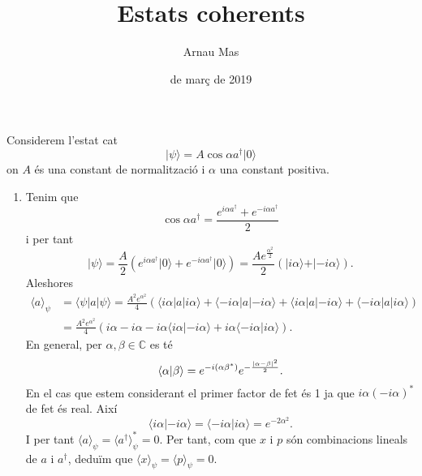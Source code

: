 \documentclass[12pt]{article}
\title{\sffamily {\bfseries Entrega 1:} Estats coherents}
\author{\sffamily Arnau Mas}
\date{\sffamily 18 de març de 2019}
\numberwithin{table}{section}
\numberwithin{figure}{section}
\numberwithin{equation}{section}
\newcommand{\C}{\mathbb{C}}
\let\Im\relax
\DeclareMathOperator{\Im}{Im}
\newcommand{\abs}[1]{\lvert #1 \rvert}
\newcommand{\ket}[1]{\vert {#1} \rangle}
\newcommand{\bra}[1]{\langle #1 \vert}
\newcommand{\braket}[2]{\langle {#1} \vert {#2} \rangle}
\begin{document}
\maketitle

Considerem l'estat cat
\begin{equation*}
	\ket{\psi} = A \cos{\alpha a^{\dagger}} \ket{0}
\end{equation*}
on \( A \) és una constant de normalització i \( \alpha \) una constant positiva.

\begin{enumerate}[label=(\alph*), font=\bfseries \sffamily, wide, labelwidth=!, labelindent=0pt]
	\item Tenim que
		\begin{equation*}
		\cos{\alpha a^\dagger} = \frac{e^{i\alpha a^\dagger} + e^{-i \alpha a^\dagger}}{2}
		\end{equation*}
	i per tant
	\begin{equation*}
		\ket{\psi} = \frac{A}{2} \left(e^{i\alpha a^\dagger} \ket{0} + e^{-i \alpha a^\dagger} \ket{0} \right) = \frac{Ae^{\frac{\alpha^2}{2}}}{2}\left(\ket{i\alpha} + \ket{-i\alpha}\right).
	\end{equation*}
Aleshores
\begin{align*}
	\langle a \rangle_\psi & = \bra{\psi} a \ket{\psi} = \frac{A^2e^{\alpha^2}}{4} \left(\bra{i\alpha} a \ket{i\alpha} + \bra{-i\alpha} a \ket{-i\alpha} + \bra{i\alpha} a \ket{-i \alpha} + \bra{-i \alpha} a \ket{i \alpha} \right) \\
												 & = \frac{A^2e^{\alpha^2}}{4} \left(i\alpha - i\alpha - i\alpha \braket{i\alpha}{-i\alpha} + i\alpha \braket{-i\alpha}{i\alpha} \right).
\end{align*}
En general, per \( \alpha, \beta \in \C \) es té
\begin{equation*}
	\braket{\alpha}{\beta} = e^{-i \Im{\left(\alpha \beta^\ast\right)}} e^{- \frac{\abs{\alpha - \beta}^2}{2}}.
\end{equation*}
En el cas que estem considerant el primer factor de fet és 1 ja que \( i\alpha(-i \alpha)^\ast \) de fet és real. Així
\begin{equation*}
	\braket{i\alpha}{-i\alpha} = \braket{-i\alpha}{i\alpha} = e^{-2\alpha^2}.
\end{equation*}
I per tant \( \langle a \rangle_\psi = \langle a^\dagger \rangle_\psi^{\ast} = 0 \). Per tant, com que \( x \) i \( p \) són combinacions lineals de \( a \) i \( a^\dagger \), deduïm que \( \langle x \rangle_\psi = \langle p \rangle_\psi = 0 \).


\end{enumerate}
\end{document}
